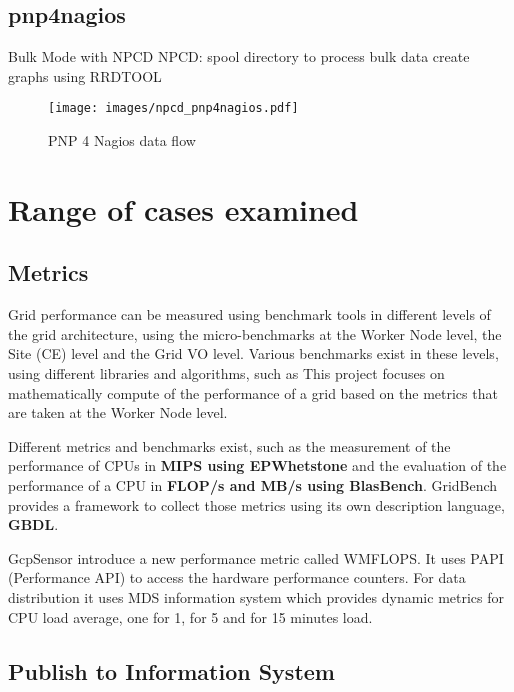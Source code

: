 \subsection{pnp4nagios}

Bulk Mode with NPCD
NPCD:
spool directory to process bulk data
create graphs using RRDTOOL

\begin{figure}[htb]
\centering
 \texttt{[image: images/npcd\_pnp4nagios.pdf]}
\caption{PNP 4 Nagios data flow}
\label{figure:pnp4nagios}
\end{figure}

\section{Range of cases examined}
\subsection{Metrics}

Grid performance can be measured using benchmark tools in different levels of
the grid architecture, using the micro-benchmarks at the Worker Node level, the
Site (CE) level and the Grid VO level. Various benchmarks exist in these
levels, using different libraries and algorithms, such as  This project focuses
on mathematically compute of the performance of a grid based on the metrics that
are taken at the Worker Node level.

Different metrics and benchmarks exist, such as the measurement of
the performance of CPUs in {\bf MIPS using EPWhetstone} and the evaluation of
the performance of a CPU in {\bf FLOP/s and MB/s using BlasBench}. GridBench
\cite{gridbench} provides a framework to collect those metrics using its own
description language, {\bf GBDL}.

GcpSensor \cite{gcpsensor} introduce a new performance metric called WMFLOPS. It
uses PAPI \cite{papi} (Performance API) to access the hardware performance
counters. For data distribution it uses MDS information system which provides
dynamic metrics for CPU load average, one for 1, for 5 and for 15 minutes load.

\subsection{Publish to Information System}

